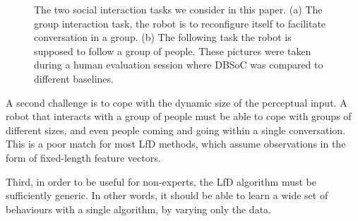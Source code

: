 \documentclass[letterpaper, 10 pt, conference]{ieeeconf}
\begin{document}
\begin{figure}[t]
\begin{subfigure}[b]{0.39\columnwidth}
    \caption{}
    \label{fig:follow}
  \end{subfigure} 
  \caption{The two social interaction tasks we consider in this paper. (a) The group interaction task, the robot is to reconfigure itself to facilitate conversation in a group. (b) The following task the robot is supposed to follow a group of people. These pictures were taken during a human evaluation session where DBSoC was compared to different baselines. }

  \vspace{-7mm}

  \label{fig:behaviors}
  \end{figure}

A second challenge is to cope with the dynamic size of the perceptual input.  A robot that interacts with a group of people must be able to cope with groups of different sizes, and even people coming and going within a single conversation.  This is a poor match for most LfD methods, which assume observations in the form of fixed-length feature vectors.

Third, in order to be useful for non-experts, the LfD algorithm must be sufficiently generic. In other words, it should be able to learn a wide set of behaviours with a single algorithm, by varying only the data. 


\end{document}
